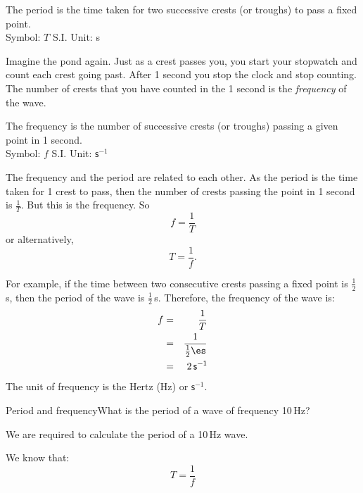 \begin{definition}
 { \label{m38806*meaningfhsst!!!underscore!!!id426}The period is the time taken for two successive crests (or troughs) to pass a fixed point.\\
Symbol: $T$ \hspace{2cm} S.I. Unit: s  } 


\label{m38806*id319238}Imagine the pond again. Just as a crest passes you, you start your stopwatch and count each crest going past. After 1 second you stop the clock and stop counting. The number of crests that you have counted in the 1 second is the \textsl{frequency} of the wave.\par 

 { \label{m38806*meaningfhsst!!!underscore!!!id430}
        The frequency is the number of successive crests (or troughs) passing a given point in 1 second.\\
Symbol: $f$ \hspace{2cm} S.I. Unit: $\mathsf{s}^{-1}$

         } 
        
The frequency and the period are related to each other. As the period is the time taken for 1 crest to pass, then the number of crests passing the point in 1 second is $\frac{1}{T}$. But this is the frequency. So
\begin{equation*}
f=\frac{1}{T}
\end{equation*}
or alternatively,
\begin{equation*}
T=\frac{1}{f}.
\end{equation*}

For example, if the time between two consecutive crests passing a fixed point is $\frac{1}{2}\,$s, then the period of the wave is $\frac{1}{2}\,$s. Therefore, the frequency of the wave is:
\begin{eqnarray*}
f&=&\frac{1}{T}\\
&=&\frac{1}{\frac{1}{2}\es}\\
&=&2\,\mathsf{s^{-1}}
\end{eqnarray*}
The unit of frequency is the Hertz (Hz) or $\mathsf{s}^{-1}$.


\begin{wex}{Period and frequency}{What is the period of a wave of frequency 10\,Hz?}{
We are required to calculate the period of a 10\,Hz wave.

We know that:
\begin{equation}
T=\frac{1}{f}\nonumber 
\end{equation}

}
\end{wex}
\end{definition}

